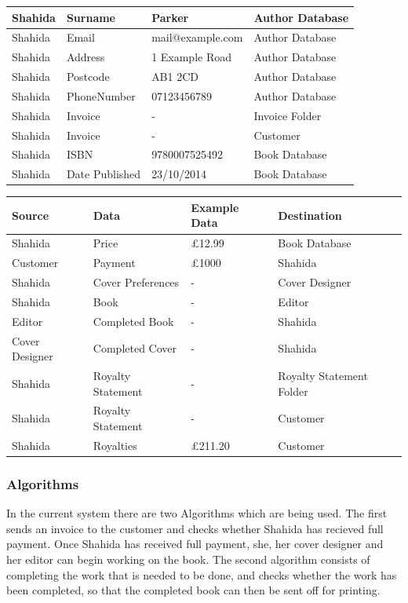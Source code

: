 \begin{center}
\begin{tabular}{|p{1.5cm}|p{3cm}|p{3cm}|p{2.5cm}|}
    Shahida & Surname & Parker & Author Database  \\ \hline
    Shahida & Email & mail@example.com & Author Database  \\ \hline
    Shahida & Address & 1 Example Road & Author Database  \\ \hline
    Shahida & Postcode & AB1 2CD & Author Database  \\ \hline
    Shahida & PhoneNumber & 07123456789 & Author Database  \\ \hline
    Shahida & Invoice & - & Invoice Folder \\ \hline
    Shahida & Invoice & - & Customer  \\ \hline
    Shahida & ISBN & 9780007525492 & Book Database \\ \hline
    Shahida & Date Published & 23/10/2014 & Book Database \\ \hline
\end{tabular}
\end{center}

\begin{center}
\begin{tabular}{|p{1.5cm}|p{3cm}|p{3cm}|p{2.5cm}|}
    \hline
    \textbf{Source} & \textbf{Data} & \textbf{Example Data} & \textbf{Destination} \\ \hline
    Shahida & Price & £12.99 & Book Database \\ \hline
    Customer & Payment & £1000 & Shahida  \\ \hline
    Shahida & Cover Preferences & - & Cover Designer\\ \hline
    Shahida & Book & - & Editor  \\ \hline
    Editor & Completed Book & - & Shahida  \\ \hline
    Cover Designer & Completed Cover & - & Shahida \\ \hline
    Shahida & Royalty Statement & - & Royalty Statement Folder \\ \hline
    Shahida & Royalty Statement & - & Customer \\ \hline
    Shahida & Royalties & £211.20 & Customer \\ \hline 
    \hline
\end{tabular}
\end{center}


\subsubsection{Algorithms}
In the current system there are two Algorithms which are being used. The first sends an invoice to the customer and checks whether Shahida has recieved full payment. Once Shahida has received full payment, she, her cover designer and her editor can begin working on the book. The second algorithm consists of completing the work that is needed to be done, and checks whether the work has been completed, so that the completed book can then be sent off for printing. 

